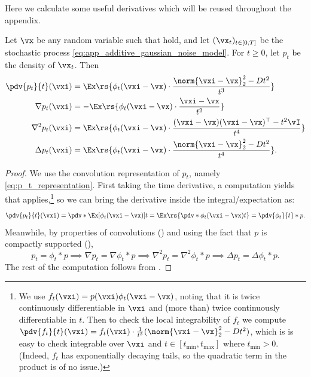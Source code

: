 \documentclass[../../book-main.tex]{subfiles}
\begin{document}
Here we calculate some useful derivatives which will be reused
throughout the appendix.

\begin{proposition}\label{prop:p_t_derivatives}
    Let \(\vx\) be any random variable such that
    hold, and let \((\vx_{t})_{t \in [0, T]}\) be the stochastic
    process \eqref{eq:app_additive_gaussian_noise_model}. For \(t
    \geq 0\), let \(p_{t}\) be the density of \(\vx_{t}\). Then
    \begin{align}
        \pdv{p_{t}}{t}(\vxi)
        &= \Ex\rs{\phi_{t}(\vxi - \vx)\cdot\frac{\norm{\vxi -
        \vx}_{2}^{2} - Dt^{2}}{t^{3}}} \\
        \nabla p_{t}(\vxi)
        &= -\Ex\rs{\phi_{t}(\vxi - \vx)\cdot\frac{\vxi - \vx}{t^{2}}} \\
        \nabla^{2}p_{t}(\vxi)
        &= \Ex\rs{\phi_{t}(\vxi - \vx)\cdot\frac{(\vxi - \vx)(\vxi -
        \vx)^{\top} - t^{2}\vI}{t^{4}}} \\
        \Delta p_{t}(\vxi)
        &= \Ex\rs{\phi_{t}(\vxi - \vx)\cdot\frac{\norm{\vxi -
        \vx}_{2}^{2} - Dt^{2}}{t^{4}}}.
    \end{align}
\end{proposition}
\begin{proof}
    We use the convolution representation of \(p_{t}\), namely
    \eqref{eq:p_t_representation}. First taking the time derivative,
    a computation yields that  applies,\footnote{We
        use \(f_{t}(\vxi) = p(\vxi) \phi_{t}(\vxi - \vx)\), noting that
        it is twice continuously differentiable in \(\vxi\) and (more
        than) twice continuously differentiable in \(t\). Then to check
        the local integrability of \(f_{t}\) we compute
        \(\pdv{f_{t}}{t}(\vxi) = f_{t}(\vxi)\cdot
        \frac{1}{t^{3}}(\norm{\vxi - \vx}_{2}^{2} - Dt^{2})\), which is
        is easy to check integrable over \(\vxi\) and \(t \in [t_{\min},
        t_{\max}]\) where \(t_{\min} > 0\). (Indeed, \(f_{t}\) has
            exponentially decaying tails, so the quadratic term in the
    product is of no issue.)} so we can bring the derivative inside
    the integral/expectation as:
    \begin{equation}
        \pdv{p_{t}}{t}(\vxi) = \pdv*{\Ex[\phi_{t}(\vxi - \vx)]}{t} =
        \Ex\rs{\pdv*{\phi_{t}(\vxi - \vx)}{t}} = \pdv{\phi_{t}}{t} * p.
    \end{equation}
    Meanwhile, by properties of convolutions
    () and using the fact that \(p\) is
    compactly supported (),
    \begin{equation}
        p_{t} = \phi_{t} * p \implies \nabla p_{t} = \nabla \phi_{t}
        * p \implies \nabla^{2}p_{t} = \nabla^{2}\phi_{t} * p
        \implies \Delta p_{t} = \Delta \phi_{t} * p.
    \end{equation}
    The rest of the computation follows from .
\end{proof}
\end{document}
